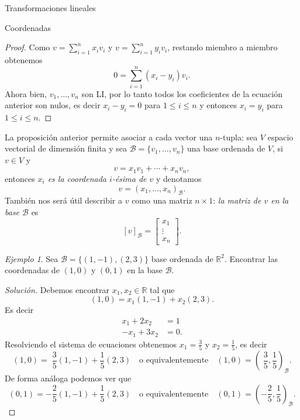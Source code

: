 \documentclass[a4paper,12pt,twoside,spanish,reqno]{amsbook}
\numberwithin{equation}{section}
\theoremstyle{definition}
\theoremstyle{remark}
\newtheorem*{ejemplo*}{Ejemplo}
\newcommand{\R}{\mathbb R}
\begin{document}
\begin{chapter}{Transformaciones lineales}
\begin{section}{Coordenadas}
\begin{proof}
            Como $v =  \sum_{i=1}^{n} x_iv_i$ y $v =  \sum_{i=1}^{n} y_iv_i$,  restando miembro a miembro obtenemos 
            $$
            0 =   \sum_{i=1}^{n} (x_i-y_i)v_i.
            $$
            Ahora bien,  $v_1,\ldots,v_n$ son  LI, por lo tanto todos los coeficientes de la ecuación anterior son nulos, es decir $x_i-y_i=0$ para $1 \le i \le n$ y entonces $x_i = y_i$ para $1 \le i \le n$.
        \end{proof}
    
    La proposición anterior permite asociar a cada vector una $n$-tupla: sea $V$  espacio vectorial de dimensión finita y sea $\mathcal{B} = \{v_1,\ldots,v_n\}$ una base ordenada de $V$, si $v \in V$ y $$v =   x_1v_1 + \cdots +x_nv_n,$$  entonces \textit{$x_i$ es la coordenada $i$-ésima de $v$} y denotamos
    $$
    v = (x_1,\ldots,x_n)_{\mathcal B}.
    $$
    También nos será útil describir a $v$ como una matriz $n \times 1$: \textit{la matriz de $v$  en la base  $\mathcal{B}$}  es
    $$
    [v]_\mathcal{B} = \begin{bmatrix}x_1 \\ \vdots \\ x_n\end{bmatrix}.
    $$
    
    \begin{ejemplo*}
        Sea $\mathcal B = \{(1,-1),(2,3)\}$ base ordenada de $\R^2$. Encontrar las coordenadas  de $(1,0)$ y $(0,1)$ en la base $\mathcal B$.
    \end{ejemplo*}
    \begin{proof}[Solución] Debemos encontrar $x_1, x_2 \in \R$ tal que 
        $$
        (1,0) = x_1(1,-1)+ x_2(2,3).
        $$
        Es decir 
        \begin{align*}
            x_1+ 2x_2 &= 1\\
            -x_1 + 3x_2 &= 0.
        \end{align*}
        Resolviendo el sistema de ecuaciones obtenemos $x_1 = \frac35$ y $x_2 = \frac15$,  es decir
        $$
        (1,0) =\; \frac35(1,-1)+ \frac15(2,3)\quad \text{o equivalentemente} \quad (1,0) = (\;\frac35,\frac15)_{\mathcal B}.
        $$ 
        De forma análoga podemos ver que
        $$
        (0,1) = -\frac25(1,-1)+ \frac15(2,3)\quad \text{o equivalentemente} \quad (0,1) = (-\frac25,\frac15)_{\mathcal B}.
        $$
    \end{proof}
    

\end{section}
\end{chapter}
\end{document}

